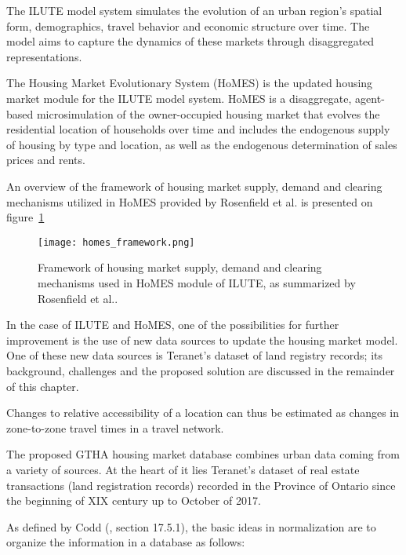 The ILUTE model system simulates the evolution of an urban region's spatial form, demographics, travel behavior and economic structure over time.
The model aims to capture the dynamics of these markets through disaggregated representations.

The Housing Market Evolutionary System (HoMES) is the updated housing market module for the ILUTE model system.
HoMES is a disaggregate, agent-based microsimulation of the owner-occupied housing market that evolves the residential location of households over time and includes the endogenous supply of housing by type and location, as well as the endogenous determination of sales prices and rents.

An overview of the framework of housing market supply, demand and clearing mechanisms utilized in HoMES provided by Rosenfield et al.\cite{Rosenfield2013} is presented on figure~\ref{fig:homes_framework}
\begin{figure}[hbt!]
    \centering
    \texttt{[image: homes\_framework.png]}
    \caption{Framework of housing market supply, demand and clearing mechanisms used in HoMES module of ILUTE, as summarized by Rosenfield et al.\cite{Rosenfield2013}.}
    \label{fig:homes_framework}
\end{figure}

In the case of ILUTE and HoMES, one of the possibilities for further improvement is the use of new data sources to update the housing market model.
One of these new data sources is Teranet's dataset of land registry records;
its background, challenges and the proposed solution are discussed in the remainder of this chapter.

Changes to relative accessibility of a location can thus be estimated as changes in zone-to-zone travel times in a travel network\cite{Iacono2008}.


The proposed GTHA housing market database combines urban data coming from a variety of sources.
At the heart of it lies Teranet's dataset of real estate transactions (land registration records) recorded in the Province of Ontario since the beginning of XIX century up to October of 2017.




As defined by Codd (\cite{Codd1990}, section 17.5.1), the basic ideas in normalization are to organize the information in a database as follows:


